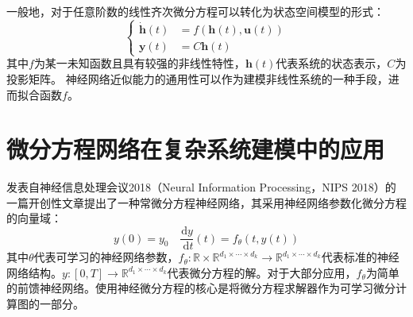 一般地，对于任意阶数的线性齐次微分方程可以转化为状态空间模型的形式：
\begin{equation}
    \left\{
    \begin{aligned}
\dot {\boldsymbol h}(t)&=f(\boldsymbol h(t), \boldsymbol{u}(t))\\
\boldsymbol y(t)&= C \boldsymbol h(t)
    \end{aligned}
    \right.
\end{equation}
其中$f$为某一未知函数且具有较强的非线性特性，$\boldsymbol h(t)$代表系统的状态表示，$C$为投影矩阵。
神经网络近似能力的通用性可以作为建模非线性系统的一种手段\cite{funahashi1993approximation}，进而拟合函数$f$。


\section{微分方程网络在复杂系统建模中的应用}
发表自神经信息处理会议2018（Neural Information Processing，NIPS 2018）的一篇开创性文章\cite{chen2018neural}提出了一种常微分方程神经网络，其采用神经网络参数化微分方程的向量域\cite{kidger2021}：
\begin{equation}
y(0)=y_0 \quad \frac{\mathrm{d} y}{\mathrm{~d} t}(t)=f_\theta(t, y(t))
\end{equation}
其中$\theta$代表可学习的神经网络参数，$f_\theta: \mathbb{R} \times \mathbb{R}^{d_1 \times \cdots \times d_k} \rightarrow \mathbb{R}^{d_1 \times \cdots \times d_k}$代表标准的神经网络结构。$y:[0, T] \rightarrow \mathbb{R}^{d_1 \times \cdots \times d_k}$代表微分方程的解。对于大部分应用，$f_\theta$为简单的前馈神经网络。使用神经微分方程的核心是将微分方程求解器作为可学习微分计算图的一部分。

